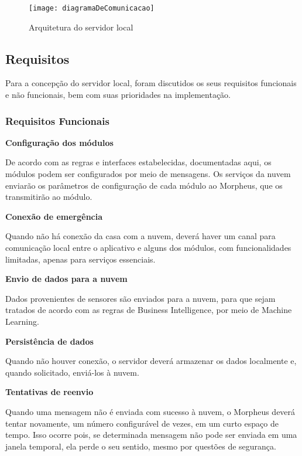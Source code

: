 \begin{figure}
	\centering
	\caption{Arquitetura do servidor local}
  \texttt{[image: diagramaDeComunicacao]}
\label{fig:diagramaDeComunicacao}
\end{figure}

\subsection{Requisitos}
Para a concepção do servidor local, foram discutidos os seus requisitos funcionais e não funcionais, bem com suas prioridades na implementação.

\subsubsection{Requisitos Funcionais}
\begin{description}

\item \textbf{Configuração dos módulos}

De acordo com as regras e interfaces estabelecidas, documentadas aqui, os módulos podem ser configurados por meio de mensagens. Os serviços da nuvem enviarão os parâmetros de configuração de cada módulo ao Morpheus, que os transmitirão ao módulo.

\item \textbf{Conexão de emergência}

Quando não há conexão da casa com a nuvem, deverá haver um canal para comunicação local entre o aplicativo e alguns dos módulos, com funcionalidades limitadas, apenas para serviços essenciais.

\item \textbf{Envio de dados para a nuvem}

Dados provenientes de sensores são enviados para a nuvem, para que sejam tratados de acordo com as regras de Business Intelligence, por meio de Machine Learning.

\item \textbf{Persistência de dados}

Quando não houver conexão, o servidor deverá armazenar os dados localmente e, quando solicitado, enviá-los à nuvem.

\item \textbf{Tentativas de reenvio}

Quando uma mensagem não é enviada com sucesso à nuvem, o Morpheus deverá tentar novamente, um número configurável de vezes, em um 
curto espaço de tempo. Isso ocorre pois, se determinada mensagem não pode ser enviada em uma janela temporal, ela perde o seu sentido, mesmo por questões de segurança.


\end{description}
